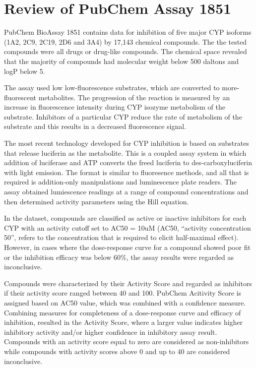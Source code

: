 


\section{Review of PubChem Assay 1851}
  

PubChem BioAssay 1851 contains data for inhibition of five major CYP isoforms (1A2, 2C9, 2C19, 2D6 and 3A4) by 17,143 chemical compounds. \cite{Veith2009} The the tested compounds were all drugs or drug-like compounds. The chemical space revealed that the majority of compounds had molecular weight below 500 daltons and logP below 5. \cite{Lapins2013}

The assay used low low-fluorescence substrates, which are converted to more-fluorescent metabolites. The progression of the reaction is measured by an increase in fluorescence intensity during CYP isozyme metabolism of the substrate. Inhibitors of a particular CYP reduce the rate of metabolism of the substrate and this results in a decreased fluorescence signal. \cite{Zlokarnik2005}

The most recent technology developed for CYP inhibition is based on substrates that release luciferin as the metabolite. This is a coupled assay system in which addition of luciferase and ATP converts the freed luciferin to des-carboxyluciferin with light emission. The format is similar to fluoresence methods, and all that is required is addition-only manipulations and luminescence plate readers. \cite{Zlokarnik2005} The assay obtained lumiescence readings at a range of compound concentrations and then determined activity parameters using the Hill equation.



In the dataset, compounds are classified as active or inactive inhibitors for each CYP with an activity cutoff set to AC50 = 10uM (AC50, “activity concentration 50”, refers to the concentration that is required to elicit half-maximal effect). However, in cases where the dose-response curve for a compound showed poor fit or the inhibition efficacy was below 60\%, the assay results were regarded as inconclusive. \cite{Lapins2013}

Compounds were characterized by their Activity Score and regarded as inhibitors if their activity score ranged between 40 and 100. PubChem Acitivity Score is assigned based on AC50 value, which was combined with a confidence measure. Combining measures for completeness of a dose-response curve and efficacy of inhibition, resulted in the Activity Score, where a larger value indicates higher inhibitory activity and/or higher confidence in inhibitory assay result. Compounds with an activity score equal to zero are considered as non-inhibitors while compounds with activity scores above 0 and up to 40 are considered inconclusive. \cite{Lapins2013}

